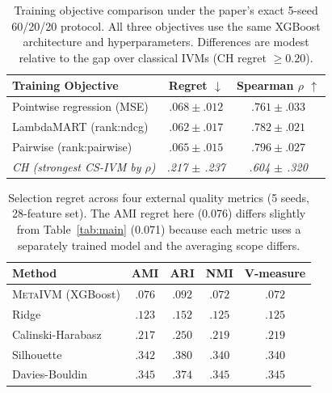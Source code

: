 \documentclass[10pt]{article} %
\newcommand{\ours}{\textsc{MetaIVM}}
\begin{document}
\begin{table}[h]
\centering
\caption{Training objective comparison under the paper's exact 5-seed 60/20/20 protocol. All three objectives use the same XGBoost architecture and hyperparameters. Differences are modest relative to the gap over classical IVMs (CH regret $\geq 0.20$).}
\label{tab:ranking_objectives}
\small
\begin{tabular}{lcc}
\toprule
\textbf{Training Objective} & \textbf{Regret} $\downarrow$ & \textbf{Spearman} $\rho$ $\uparrow$ \\
\midrule
Pointwise regression (MSE) & $.068 \pm .012$ & $.761 \pm .033$ \\
LambdaMART (rank:ndcg) & $.062 \pm .017$ & $.782 \pm .021$ \\
Pairwise (rank:pairwise) & $.065 \pm .015$ & $.796 \pm .027$ \\
\midrule
\textit{CH (strongest CS-IVM by $\rho$)} & \textit{.217 $\pm$ .237} & \textit{.604 $\pm$ .320} \\
\bottomrule
\end{tabular}
\end{table}

\begin{table}[h]
\centering
\caption{Selection regret across four external quality metrics (5 seeds, 28-feature set). The AMI regret here (0.076) differs slightly from Table~\ref{tab:main} (0.071) because each metric uses a separately trained model and the averaging scope differs.}
\label{tab:multitarget}
\small
\begin{tabular}{lcccc}
\toprule
\textbf{Method} & \textbf{AMI} & \textbf{ARI} & \textbf{NMI} & \textbf{V-measure} \\
\midrule
\ours{} (XGBoost) & $\mathbf{.076}$ & $\mathbf{.092}$ & $\mathbf{.072}$ & $\mathbf{.072}$ \\
Ridge & $.123$ & $.152$ & $.125$ & $.125$ \\
\midrule
Calinski-Harabasz & $.217$ & $.250$ & $.219$ & $.219$ \\
Silhouette & $.342$ & $.380$ & $.340$ & $.340$ \\
Davies-Bouldin & $.345$ & $.374$ & $.345$ & $.345$ \\
\bottomrule
\end{tabular}
\end{table}
\end{document}

